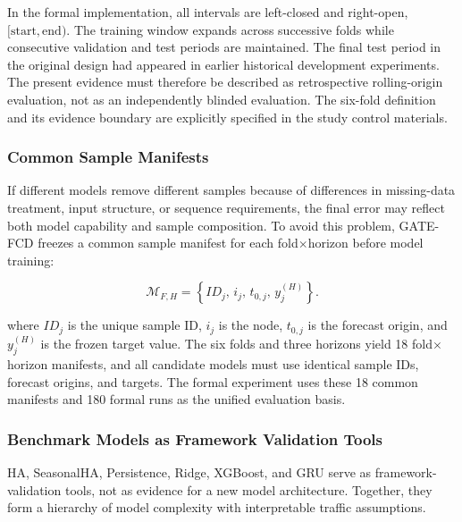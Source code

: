 \documentclass[pdflatex,sn-mathphys-num,iicol]{sn-jnl}
\begin{document}
In the formal implementation, all intervals are left-closed and right-open, $[\mathrm{start},\mathrm{end})$. The training window expands across successive folds while consecutive validation and test periods are maintained. The final test period in the original design had appeared in earlier historical development experiments. The present evidence must therefore be described as retrospective rolling-origin evaluation, not as an independently blinded evaluation. The six-fold definition and its evidence boundary are explicitly specified in the study control materials.



\subsubsection{Common Sample Manifests}
\label{subsubsec:common-manifests}

If different models remove different samples because of differences in missing-data treatment, input structure, or sequence requirements, the final error may reflect both model capability and sample composition. To avoid this problem, GATE-FCD freezes a common sample manifest for each fold$\times$horizon before model training:

\[
\mathcal{M}_{F,H}
=
\left\{
ID_j,\,
i_j,\,
t_{0,j},\,
y_j^{(H)}
\right\}.
\]

where $ID_j$ is the unique sample ID, $i_j$ is the node, $t_{0,j}$ is the forecast origin, and $y_j^{(H)}$ is the frozen target value. The six folds and three horizons yield 18 fold$\times$horizon manifests, and all candidate models must use identical sample IDs, forecast origins, and targets. The formal experiment uses these 18 common manifests and 180 formal runs as the unified evaluation basis.



\subsubsection{Benchmark Models as Framework Validation Tools}
\label{subsubsec:benchmark-models}

HA, SeasonalHA, Persistence, Ridge, XGBoost, and GRU serve as framework-validation tools, not as evidence for a new model architecture. Together, they form a hierarchy of model complexity with interpretable traffic assumptions.
\end{document}
